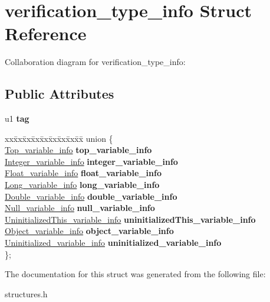 \hypertarget{structverification__type__info}{}\section{verification\+\_\+type\+\_\+info Struct Reference}
\label{structverification__type__info}


Collaboration diagram for verification\+\_\+type\+\_\+info\+:
\subsection*{Public Attributes}
\begin{DoxyCompactItemize}
\item 
u1 {\bfseries tag}\hypertarget{structverification__type__info_aeb9c72b398b4d3ce0863a916f973b05c}{}\label{structverification__type__info_aeb9c72b398b4d3ce0863a916f973b05c}

\item 
\begin{tabbing}
xx\=xx\=xx\=xx\=xx\=xx\=xx\=xx\=xx\=\kill
union \{\\
\>\hyperlink{structTop__variable__info}{Top\_variable\_info} {\bfseries top\_variable\_info}\\
\>\hyperlink{structInteger__variable__info}{Integer\_variable\_info} {\bfseries integer\_variable\_info}\\
\>\hyperlink{structFloat__variable__info}{Float\_variable\_info} {\bfseries float\_variable\_info}\\
\>\hyperlink{structLong__variable__info}{Long\_variable\_info} {\bfseries long\_variable\_info}\\
\>\hyperlink{structDouble__variable__info}{Double\_variable\_info} {\bfseries double\_variable\_info}\\
\>\hyperlink{structNull__variable__info}{Null\_variable\_info} {\bfseries null\_variable\_info}\\
\>\hyperlink{structUninitializedThis__variable__info}{UninitializedThis\_variable\_info} {\bfseries uninitializedThis\_variable\_info}\\
\>\hyperlink{structObject__variable__info}{Object\_variable\_info} {\bfseries object\_variable\_info}\\
\>\hyperlink{structUninitialized__variable__info}{Uninitialized\_variable\_info} {\bfseries uninitialized\_variable\_info}\\
\}; \hypertarget{structverification__type__info_a742e5022806c973ace237c359897885c}{}\label{structverification__type__info_a742e5022806c973ace237c359897885c}
\\

\end{tabbing}\end{DoxyCompactItemize}


The documentation for this struct was generated from the following file\+:\begin{DoxyCompactItemize}
\item 
structures.\+h\end{DoxyCompactItemize}
